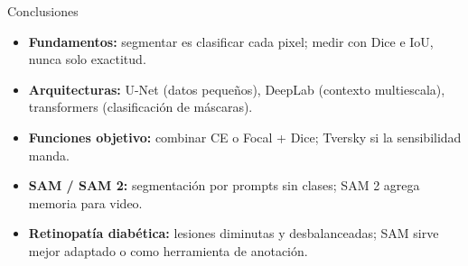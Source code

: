 \documentclass[aspectratio=169, 10pt]{beamer}
\begin{document}
\begin{frame}{Conclusiones}

	\begin{itemize}
		\item \textbf{Fundamentos:} segmentar es clasificar cada pixel; medir con Dice e IoU, nunca solo exactitud.

		\vspace{0.25cm}

		\item \textbf{Arquitecturas:} U-Net (datos peque\~nos), DeepLab (contexto multiescala), transformers (clasificaci\'on de m\'ascaras).

		\vspace{0.25cm}

		\item \textbf{Funciones objetivo:} combinar CE o Focal + Dice; Tversky si la sensibilidad manda.

		\vspace{0.25cm}

		\item \textbf{SAM / SAM 2:} segmentaci\'on por prompts sin clases; SAM 2 agrega memoria para video.

		\vspace{0.25cm}

		\item \textbf{Retinopat\'ia diab\'etica:} lesiones diminutas y desbalanceadas; SAM sirve mejor adaptado o como herramienta de anotaci\'on.
	\end{itemize}

\end{frame}
\end{document}
